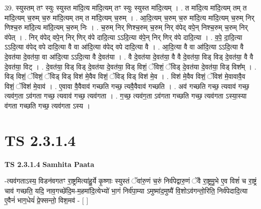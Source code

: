 \documentclass[17pt]{extarticle}
\begin{document}
39. स्युस्तम् तꣳ स्युः स्युस्त मा॑दि॒त्य मा॑दि॒त्यम् तꣳ स्युः स्युस्त मा॑दि॒त्यम् । . त मा॑दि॒त्य मा॑दि॒त्यम् तम् त मा॑दि॒त्यम् च॒रुम् च॒रु मा॑दि॒त्यम् तम् त मा॑दि॒त्यम् च॒रुम् । . आ॒दि॒त्यम् च॒रुम् च॒रु मा॑दि॒त्य मा॑दि॒त्यम् च॒रुम् निर् णिश्च॒रु मा॑दि॒त्य मा॑दि॒त्यम् च॒रुम् निः । . च॒रुम् निर् णिश्च॒रुम् च॒रुम् निर् व॑पेद् वपे॒न् निश्च॒रुम् च॒रुम् निर् व॑पेत् । . निर् व॑पेद् वपे॒न् निर् णिर् व॑पे दादि॒त्या ऽऽदि॒त्या व॑पे॒न् निर् णिर् व॑पे दादि॒त्या । . व॒पे॒ दा॒दि॒त्या ऽऽदि॒त्या व॑पेद् वपे दादि॒त्या वै वा आ॑दि॒त्या व॑पेद् वपे दादि॒त्या वै । . आ॒दि॒त्या वै वा आ॑दि॒त्या ऽऽदि॒त्या वै दे॒वत॑या दे॒वत॑या॒ वा आ॑दि॒त्या ऽऽदि॒त्या वै दे॒वत॑या । . वै दे॒वत॑या दे॒वत॑या॒ वै वै दे॒वत॑या॒ विड् विड् दे॒वत॑या॒ वै वै दे॒वत॑या॒ विट् । . दे॒वत॑या॒ विड् विड् दे॒वत॑या दे॒वत॑या॒ विड् विशं॒ ॅविशं॒ ॅविड् दे॒वत॑या दे॒वत॑या॒ विड् विश᳚म् । . विड् विशं॒ ॅविशं॒ ॅविड् विड् विश॑ मे॒वैव विशं॒ ॅविड् विड् विश॑ मे॒व । . विश॑ मे॒वैव विशं॒ ॅविश॑ मे॒वावावै॒व विशं॒ ॅविश॑ मे॒वाव॑ । . ए॒वावा वै॒वैवाव॑ गच्छति गच्छ॒ त्यवै॒वैवाव॑ गच्छति । . अव॑ गच्छति गच्छ॒ त्यवाव॑ गच्छ॒ त्यव॑ग॒ता ऽव॑गता गच्छ॒ त्यवाव॑ गच्छ॒ त्यव॑गता । . ग॒च्छ॒ त्यव॑ग॒ता ऽव॑गता गच्छति गच्छ॒ त्यव॑गता ऽस्या॒स्या व॑गता गच्छति गच्छ॒ त्यव॑गता ऽस्य । \newline
\pagebreak
{}
\section*{ TS 2.3.1.4 }

\textbf{TS 2.3.1.4 } \newline
\textbf{Samhita Paata} \newline

-त्यव॑गताऽस्य॒ विडन॑वगतꣳ रा॒ष्ट्रमित्या॑हु॒र्ये कृ॒ष्णाः स्युस्तं ॅवा॑रु॒णं च॒रुं निर्व॑पेद्वारु॒णं ॅवै रा॒ष्ट्रमु॒भे ए॒व विशं॑ च रा॒ष्ट्रं चाव॑ गच्छति॒ यदि॒ नाव॒गच्छे॑दि॒म-म॒हमा॑दि॒त्येभ्यो॑ भा॒गं निर्व॑पा॒म्या ऽमुष्मा॑द॒मुष्यै॑ वि॒शोऽव॑गन्तो॒रिति॒ निर्व॑पेदादि॒त्या ए॒वैनं॑ भाग॒धेयं॑ प्रे॒फ्सन्तो॒ विश॒मव॑ - [  ] \newline
\end{document}
